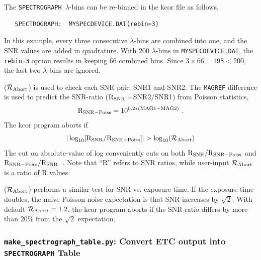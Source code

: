\documentclass[12pt]{article}
\newcommand{\SPEC}{{\tt SPECTROGRAPH}}
\newcommand{\lam}{\lambda}
\begin{document}
{The \SPEC\ $\lam$-bins can be re-binned in the kcor file
as follows,
\begin{verbatim}
   SPECTROGRAPH:  MYSPECDEVICE.DAT(rebin=3)
\end{verbatim}
%
In this example, every three consecutive $\lam$-bins are combined
into one, and the SNR values are added in quadrature. 
With 200 $\lam$-bins in {\tt MYSPECDEVICE.DAT}, the {\tt rebin=3}
option results in keeping 66 combined bins. Since $3\times 66=198 < 200$,
the last two $\lam$-bins are ignored.

\bigskip

\newcommand{\Rpredict}{{\rm R}_{\rm SNR-Poiss}}  %
\newcommand{\RSNR}{{\rm R}_{\rm SNR}}           %
\newcommand{\RRabort}{{\cal R}_{\rm Abort}}    %

($\RRabort$) is used to check each SNR pair: SNR1 and SNR2. 
The {\tt MAGREF} difference is used to predict the
SNR-ratio ($\RSNR=$SNR2/SNR1) from Poisson statistics,
%
\begin{equation}
  \Rpredict = 10^{0.2*({\rm MAG1}-{\rm MAG2})} ~.
\end{equation}
%
The kcor program aborts if
\begin{equation}
  \vert \log_{10}[\RSNR/\Rpredict] \vert  > \log_{10}(\RRabort)
\end{equation}
%
The cut on absolute-value of log conveniently cuts on both
$\RSNR/\Rpredict$ and $\Rpredict/\RSNR$~.
Note that ``R'' refers to SNR ratios, while user-input 
$\RRabort$ is a ratio of R values.

\bigskip
{}
($\RRabort$)
performs a similar test for SNR vs. exposure time. 
If the exposure time doubles, the naive Poisson noise expectation
is that SNR increases by $\sqrt{2}$.
With default $\RRabort=1.2$, the kcor program aborts if
the SNR-ratio differs by more than 20\% from the
$\sqrt{2}$ expectation.


\newcommand{\makeSpec}{{\tt make\_spectrograph\_table.py}}
\subsubsection{{\makeSpec}: Convert ETC output into {\SPEC} Table }

}
\end{document}
